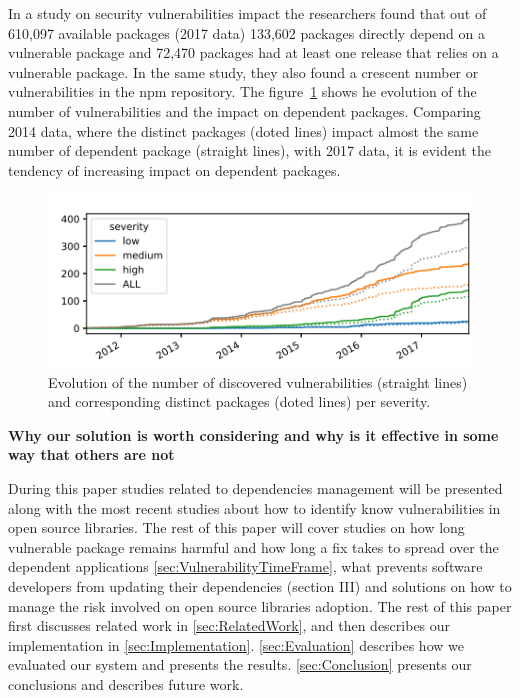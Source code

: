 \documentclass[pdf,bookmarks,colorlinks=true]{IEEEtran}
\begin{document}
In a study on security vulnerabilities impact\cite{Decan2018} the researchers found that out of 610,097 available packages (2017 data) 133,602 packages directly depend on a vulnerable package and 72,470 packages had at least one release that relies on a vulnerable package.
In the same study, they also found a crescent number or vulnerabilities in the npm repository. The figure~\ref{SVEvolution} shows he evolution of the number of vulnerabilities and the impact on dependent packages. Comparing 2014 data, where the distinct packages (doted lines) impact almost the same number of dependent package (straight lines), with 2017 data, it is evident the  tendency of increasing impact on dependent packages.

\begin{figure}[h]
	\centering
	\includegraphics[scale=0.70]{SVEvolution.png}
	\caption{Evolution of the number of discovered vulnerabilities (straight lines) and corresponding distinct packages (doted lines) per severity.}
	\label{SVEvolution}
\end{figure}



\textbf{Why our solution is worth considering and why is it effective
in some way that others are not}

During this paper studies related to dependencies management will be presented along with the most recent studies about how to identify know vulnerabilities in open source libraries.
The rest of this paper will cover studies on how long vulnerable package remains harmful and how long a fix takes to spread over the dependent applications \ref{sec:VulnerabilityTimeFrame}, what prevents software developers from updating their dependencies (section III) and solutions on how to manage the risk involved on open source libraries adoption.  
The rest of this paper first discusses related work in
\ref{sec:RelatedWork}, and then describes our implementation in
\ref{sec:Implementation}. \ref{sec:Evaluation} describes how we evaluated
our system and presents the results. \ref{sec:Conclusion} presents our
conclusions and describes future work.
\end{document}
